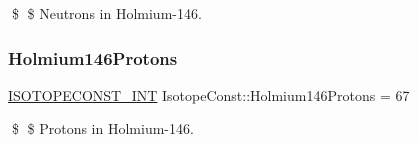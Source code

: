 \$ \$ Neutrons in Holmium-\/146. \mbox{\label{group___isotope_const-_holmium-_ho146_gada0bcf8ef4f761772ecd350d5d2ee711}} 
\subsubsection{\texorpdfstring{Holmium146\+Protons}{Holmium146Protons}}
{\footnotesize\ttfamily \mbox{\hyperlink{group___isotope_const-_macros_ga5f18360b3e99483a35c32d789e62621c}{I\+S\+O\+T\+O\+P\+E\+C\+O\+N\+S\+T\+\_\+\+I\+NT}} Isotope\+Const\+::\+Holmium146\+Protons = 67}

\$ \$ Protons in Holmium-\/146. 